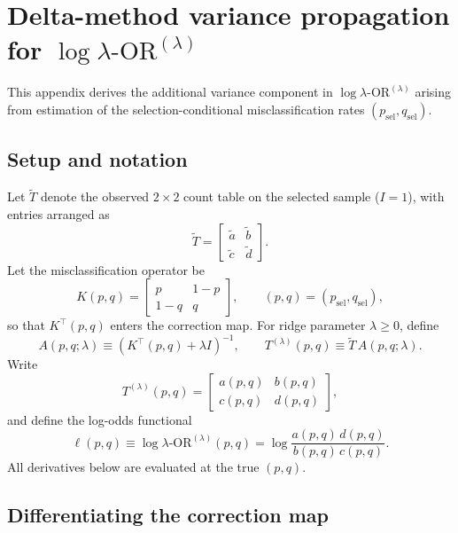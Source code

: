 \documentclass[pdflatex,sn-mathphys-num]{sn-jnl}%
\newcommand{\SPOR}{\textrm{$\lambda$-OR}}
\newcommand{\logor}{\log\SPOR}
\theoremstyle{thmstyleone}%
\theoremstyle{thmstyletwo}%
\theoremstyle{thmstylethree}%
\begin{document}



\appendix
\renewcommand{\thesection}{Appendix \arabic{section}}
\setcounter{section}{0}
\section{Delta-method variance propagation for $\logor^{(\lambda)}$}\label{app:variance}

This appendix derives the additional variance component in $\logor^{(\lambda)}$ arising from estimation of the
selection-conditional misclassification rates $(p_{\mathrm{sel}},q_{\mathrm{sel}})$.

\subsection*{Setup and notation}

Let $\tilde T$ denote the observed $2\times2$ count table on the selected sample ($I=1$),
with entries arranged as
\[
\tilde T=
\begin{bmatrix}
\tilde a & \tilde b\\
\tilde c & \tilde d
\end{bmatrix}.
\]
Let the misclassification operator be
\[
K(p,q)=
\begin{bmatrix}
p & 1-p\\
1-q & q
\end{bmatrix},
\qquad (p,q)=(p_{\mathrm{sel}},q_{\mathrm{sel}}),
\]
so that $K^\top(p,q)$ enters the correction map. For ridge parameter $\lambda\ge 0$, define
\[
A(p,q;\lambda) \equiv (K^\top(p,q)+\lambda I)^{-1},
\qquad
T^{(\lambda)}(p,q) \equiv \tilde T\,A(p,q;\lambda).
\]
Write
\[
T^{(\lambda)}(p,q)=
\begin{bmatrix}
a(p,q) & b(p,q)\\
c(p,q) & d(p,q)
\end{bmatrix},
\]
and define the log-odds functional
\[
\ell(p,q)\equiv \logor^{(\lambda)}(p,q)=\log\frac{a(p,q)\,d(p,q)}{b(p,q)\,c(p,q)}.
\]
All derivatives below are evaluated at the true $(p,q)$.

\subsection*{Differentiating the correction map}
\end{document}
